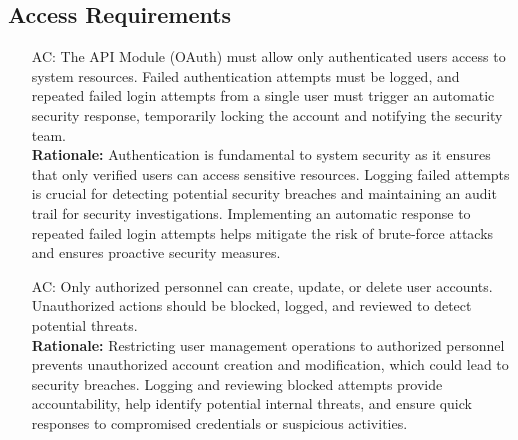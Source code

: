 \documentclass{article}
\newcounter{acnum} %
\begin{document}
\subsection{Access Requirements}
\begin{itemize}
    \item [AC\refstepcounter{acnum}\theacnum \label{AC_Authentication}:] The API Module (OAuth) must allow only authenticated users access to system resources. Failed authentication attempts must be logged, and repeated failed login attempts from a single user must trigger an automatic security response, temporarily locking the account and notifying the security team.\\
    \textbf{Rationale:} Authentication is fundamental to system security as it ensures that only verified users can access sensitive resources. Logging failed attempts is crucial for detecting potential security breaches and maintaining an audit trail for security investigations. Implementing an automatic response to repeated failed login attempts helps mitigate the risk of brute-force attacks and ensures proactive security measures.
    
    \item [AC\refstepcounter{acnum}\theacnum \label{AC_AuthorizedPersonnel}:] Only authorized personnel can create, update, or delete user accounts. Unauthorized actions should be blocked, logged, and reviewed to detect potential threats.\\
    \textbf{Rationale:} Restricting user management operations to authorized personnel prevents unauthorized account creation and modification, which could lead to security breaches. Logging and reviewing blocked attempts provide accountability, help identify potential internal threats, and ensure quick responses to compromised credentials or suspicious activities.
\end{itemize}
\end{document}
